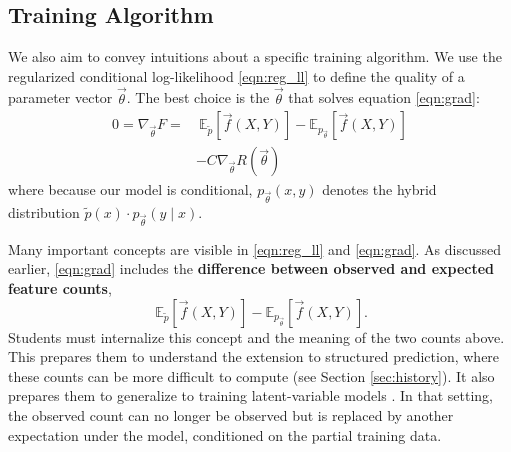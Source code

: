 \documentclass[11pt,letterpaper]{article}
\newcommand{\empirical}[0]{\ensuremath{\tilde{p}}}
\begin{document}
\subsection{Training Algorithm} 

We also aim to convey intuitions about a specific training algorithm.
We use the regularized conditional log-likelihood \eqref{eqn:reg_ll}
to define the quality of a parameter vector $\vec{\theta}$.
The best choice is the $\vec{\theta}$ that solves equation \eqref{eqn:grad}:
\begin{equation}
\begin{aligned}
0 = \nabla_{\vec{\theta}} F
 = &
\ \mathbb{E}_{\empirical{}}\left[\vec{f}(X,Y)\right] 
- \mathbb{E}_{{p_{\vec{\theta}}}}\left[\vec{f}(X,Y)\right]\\
 & - C \nabla_{\vec{\theta}}R(\vec{\theta})
\label{eqn:grad} 
\end{aligned}
\end{equation}
where because our model is conditional, $p_{\vec{\theta}}(x,y)$ denotes the hybrid distribution
$\empirical{}(x) \cdot p_{\vec{\theta}}(y\mid x)$.

Many important concepts are visible in \eqref{eqn:reg_ll} and \eqref{eqn:grad}.
%
As discussed earlier, \eqref{eqn:grad} includes the \textbf{difference between observed and
  expected feature counts}, 
\begin{equation}
\ \mathbb{E}_{\empirical{}}\left[\vec{f}(X,Y)\right] 
- \mathbb{E}_{p_{\vec{\theta}}}\left[\vec{f}(X,Y)\right].
\label{eqn:obsexp} 
\end{equation}
Students must internalize this concept and the meaning of the two counts above.
This prepares them to understand the extension to structured prediction,
where these counts can be more difficult to compute (see Section
\ref{sec:history}).  It also prepares them to generalize to training
latent-variable models \cite{petrov-klein-2008}.  In that setting, the
observed count can no longer be observed but is replaced by another
expectation under the model, conditioned on the partial training data.

\end{document}
